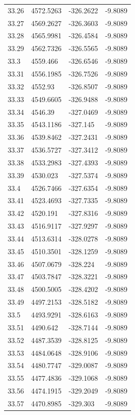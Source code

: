 \begin{table}[H]
\begin{tabular}{llll}
33.26 & 4572.5263 & -326.2622 & -9.8089 \\
33.27 & 4569.2627 & -326.3603 & -9.8089 \\
33.28 & 4565.9981 & -326.4584 & -9.8089 \\
33.29 & 4562.7326 & -326.5565 & -9.8089 \\
33.3 & 4559.466 & -326.6546 & -9.8089 \\
33.31 & 4556.1985 & -326.7526 & -9.8089 \\
33.32 & 4552.93 & -326.8507 & -9.8089 \\
33.33 & 4549.6605 & -326.9488 & -9.8089 \\
33.34 & 4546.39 & -327.0469 & -9.8089 \\
33.35 & 4543.1186 & -327.145 & -9.8089 \\
33.36 & 4539.8462 & -327.2431 & -9.8089 \\
33.37 & 4536.5727 & -327.3412 & -9.8089 \\
33.38 & 4533.2983 & -327.4393 & -9.8089 \\
33.39 & 4530.023 & -327.5374 & -9.8089 \\
33.4 & 4526.7466 & -327.6354 & -9.8089 \\
33.41 & 4523.4693 & -327.7335 & -9.8089 \\
33.42 & 4520.191 & -327.8316 & -9.8089 \\
33.43 & 4516.9117 & -327.9297 & -9.8089 \\
33.44 & 4513.6314 & -328.0278 & -9.8089 \\
33.45 & 4510.3501 & -328.1259 & -9.8089 \\
33.46 & 4507.0679 & -328.224 & -9.8089 \\
33.47 & 4503.7847 & -328.3221 & -9.8089 \\
33.48 & 4500.5005 & -328.4202 & -9.8089 \\
33.49 & 4497.2153 & -328.5182 & -9.8089 \\
33.5 & 4493.9291 & -328.6163 & -9.8089 \\
33.51 & 4490.642 & -328.7144 & -9.8089 \\
33.52 & 4487.3539 & -328.8125 & -9.8089 \\
33.53 & 4484.0648 & -328.9106 & -9.8089 \\
33.54 & 4480.7747 & -329.0087 & -9.8089 \\
33.55 & 4477.4836 & -329.1068 & -9.8089 \\
33.56 & 4474.1915 & -329.2049 & -9.8089 \\
33.57 & 4470.8985 & -329.303 & -9.8089 \\

\end{tabular}
\end{table}
